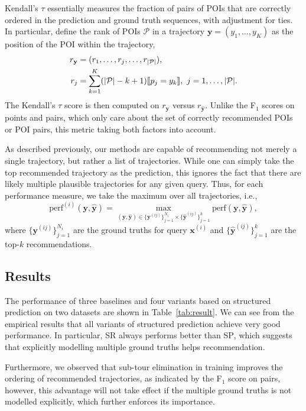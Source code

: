Kendall's $\tau$
essentially measures the fraction of pairs of POIs that are correctly ordered in the prediction and ground truth sequences,
with adjustment for ties.
In particular,
define the rank of POIs $\mathcal{P}$ in a trajectory $\mathbf{y} = (y_1,\dots,y_K)$ as
the position of the POI within the trajectory,
\begin{align*} 
r_\mathbf{y} &= (r_1,\dots,r_j,\dots,r_{|\mathcal{P}|}), \\
r_j &= \sum_{k=1}^K (| \mathcal{P} | - k + 1)  \llbracket p_j = y_k \rrbracket, ~ j = 1, \dots, | \mathcal{P} |.
\end{align*}
The Kendall's $\tau$ score is then computed on $r_\mathbf{y}$ versus $r_\mathbf{\hat{y}}$.
Unlike the F$_1$ scores on points and pairs, 
which only care about the set of correctly recommended POIs or POI pairs,
this metric taking both factors into account.

As described previously, our methods are capable of recommending not merely a single trajectory,
but rather a list of trajectories.
While one can simply take the top recommended trajectory as the prediction,
this ignores the fact that there are likely multiple plausible trajectories for any given query.
Thus, for each performance measure,
we take the maximum over all trajectories,
i.e.,
\begin{equation*}
\mathrm{perf}^{(i)}( \mathbf{y}, \hat{\mathbf{y}} ) =
\max_{(\mathbf{y}, \hat{\mathbf{y}}) \in \{\mathbf{y}^{(ij)}\}_{j=1}^{N_i} \times \{\hat{\mathbf{y}}^{(ij)}\}_{j=1}^k} 
\mathrm{perf}(\mathbf{y}, {\hat{\mathbf{y}}}),
\end{equation*}
where $\{\mathbf{y}^{(ij)}\}_{j=1}^{N_i}$ are the ground truths for query $\mathbf{x}^{(i)}$ and
$\{\hat{\mathbf{y}}^{(ij)}\}_{j=1}^k$ are the top-$k$ recommendations.



%
\subsection{Results}
\label{sec:result}



The performance of three baselines and four variants based on structured prediction on two datasets are shown in Table~\ref{tab:result}.
We can see from the empirical results that all variants of structured prediction achieve very good performance.
In particular, \textsc{SR} always performs better than \textsc{SP}, 
which suggests that explicitly modelling multiple ground truths helps recommendation.

Furthermore, we observed that sub-tour elimination in training improves the ordering of recommended trajectories, 
as indicated by the F$_1$ score on pairs, 
however, this advantage will not take effect if the multiple ground truths is not modelled explicitly,
which further enforces its importance.

